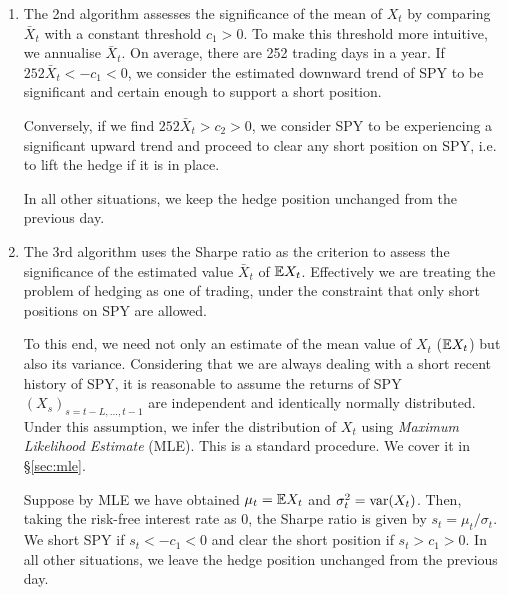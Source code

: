 \documentclass{article}
\begin{document}
\begin{enumerate}
\item The 2nd algorithm assesses the significance of the mean of $X_t$
  by comparing $\bar X_t$ with a constant threshold $c_1 > 0$. To make this
  threshold more intuitive, we annualise $\bar X_t$. On average, there
  are 252 trading days in a year. If $252 \bar X_t < -c_1 < 0$, we
  consider the estimated downward trend of SPY to be significant and
  certain enough to support a short position.

  Conversely, if we find $252 \bar X_t > c_2 > 0$, we consider SPY to be
  experiencing a significant upward trend and proceed to clear any
  short position on SPY, i.e. to lift the hedge if it is in place.

  In all other situations, we keep the hedge position unchanged from
  the previous day.
  
\item The 3rd algorithm uses the Sharpe ratio as the criterion to
  assess the significance of the estimated value $\bar X_t$ of $\mathbb{E}
  X_t$. Effectively we are treating the problem of hedging as one of
  trading, under the constraint that only short positions on SPY are
  allowed.

  To this end, we need not only an estimate of the mean value of $X_t$
  ($\mathbb{E} X_t$) but also its variance. Considering that we are always
  dealing with a short recent history of SPY, it is reasonable to
  assume the returns of SPY $(X_s)_{s = t-L, \dots, t-1}$ are
  independent and identically normally distributed. Under this
  assumption, we infer the distribution of $X_t$ using {\it Maximum
    Likelihood Estimate} (MLE). This is a standard procedure. We cover
  it in \S\ref{sec:mle}.

  Suppose by MLE we have obtained $\mu_t = \mathbb{E} X_t$ and
  $\sigma_t^2 = \text{var}(X_t)$. Then, taking the risk-free interest rate
  as 0, the Sharpe ratio is given by $s_t = \mu_t/\sigma_t$. We short
  SPY if $s_t < -c_1 < 0$ and clear the short position if
  $s_t > c_1 > 0$. In all other situations, we leave the hedge
  position unchanged from the previous day.


\end{enumerate}
\end{document}
